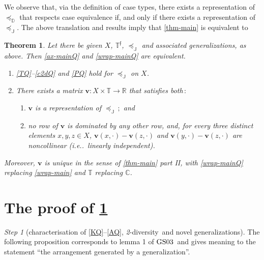 \documentclass[ecta,nameyear,draft]{econsocart}
\makeatletter
\newcommand{\countof}{\mathbin{\#}\hskip1pt}
\newcommand{\R}{\mathbb R}
\newcommand{\novel}{\mathfrak f}
\newcommand{\preceqb}{\mathbin{\preceq}}
\newcommand{\mbbd}{{\mathds D}}
\newcommand{\mbbc}{{\mathds C}}
\newcommand{\mbbt}{{\mathds {T}}}
\newcommand{\mbbtp}{{\mathds{T}^\novel}}
\newcommand{\mbbj}{\mathds J}
\newcommand{\twodiv}{\textit{2}-\textup{diversity}}
\newcommand\ie{i\@.e\@ifnextchar.{}{.\@}}
\newcommand{\gsii}{$\textup{GS03}$}
\theoremstyle{plain}
\newtheorem{theorem}{Theorem}%
\theoremstyle{remark}
\newtheorem{step}{Step}[section]
\makeatother
\begin{document}
\begin{appendix}
  We observe that, via the definition of case types, there exists a
  representation of $\preceq_{\mbbd}$ that respects case equivalence if, and
  only if there exists a representation of $\preceq_{\mbbj}$. The above
  translation and results imply that \cref{thm-main} is equivalent to
  \begin{theorem}\label{thm-mainQ} Let there be given $X$, $\mbbtp$,
    $\preceqb_{\mbbj}$ and associated {generalization}s, as above. Then
    \ref{ax-mainQ} and \ref{wrap-mainQ} are equivalent.
    \begin{enumerate}[label=\textup{(\ref{thm-mainQ}.\roman*)}]
      \item\label{ax-mainQ} \ref{TQ}--\ref{c2dQ} and \ref{PQ} hold for  
        $\preceqb _ {\mbbj}$ on $X$.
      \item\label{wrap-mainQ} There exists a matrix $\mathbf{v} : X \times
        \mbbt \rightarrow \R$ that satisfies both$\,:$
        \begin{enumerate}[label=\textup{(\ref{thm-mainQ}.\alph*)}]
          \item\label{rep-mainQ} $\mathbf{v}$ is a representation of $\preceq _
            {\mbbj}\,;$ and
          \item\label{rows-mainQ} no row of $\mathbf{v}$ is dominated by any
            other row, and, for every three distinct elements $x,y, z \in X$,
            $\mathbf{v}(x,\cdot)-\mathbf{v}(z,\cdot) $ and
            $\mathbf{v}(y,\cdot)-\mathbf{v}(z,\cdot)$ are noncollinear (\ie\
            linearly independent).
        \end{enumerate}
    \end{enumerate}
    Moreover, $\mathbf{v}$ is unique in the sense of \cref{thm-main} part II,
    with \ref{wrap-mainQ} replacing \ref{wrap-main} and $\mbbt$ replacing
    $\mbbc$.
  \end{theorem}

  \section{The proof of \cref{thm-mainQ}}\label{sec-proof-mainQ} 
  \begin{step}[characterisation of \ref{KQ}–\ref{AQ}, \twodiv\ and novel
    {generalization}s]\label{step-twodiv} The following proposition corresponds
    to lemma 1 of \gsii\ and gives meaning to the statement ``the arrangement
    generated by a {generalization}''. 
   

\end{step}
\end{appendix}
\end{document}
